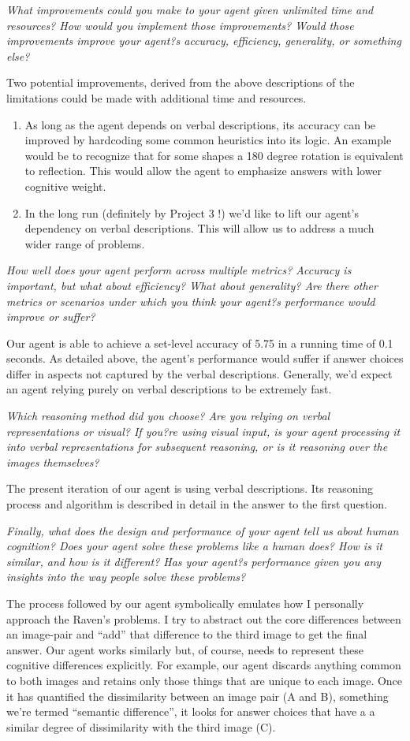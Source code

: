 \documentclass[10pt,letterpaper]{article}
\newcommand{\mypar}{\par{\vspace{0.2cm}}}
\newcommand{\rubric}[1]{\mypar{}\textcolor{mygray}{\emph{#1}}\mypar{}}
\begin{document}
\rubric{What improvements could you make to your agent given unlimited time and resources? How would you implement those improvements? Would those improvements improve your agent?s accuracy, efficiency, generality, or something else?}
Two potential improvements, derived from the above descriptions of the limitations could be made with additional time and resources.
\begin{enumerate}
\item As long as the agent depends on verbal descriptions, its accuracy can be improved by hardcoding some common heuristics into its logic. An example would be to recognize that for some shapes a 180 degree rotation is equivalent to reflection. This would allow the agent to emphasize answers with lower cognitive weight. 

\item In the long run (definitely by Project 3 !) we'd like to lift our agent's dependency on verbal descriptions. This will allow us to address a much wider range of problems.
\end{enumerate}
\rubric{How well does your agent perform across multiple metrics? Accuracy is important, but what about efficiency? What about generality? Are there other metrics or scenarios under which you think your agent?s performance would improve or suffer?}
Our agent is able to achieve a set-level accuracy of 5.75 in a running time of 0.1 seconds. As detailed above, the agent's performance would suffer if answer choices differ in aspects not captured by the verbal descriptions. Generally, we'd expect an agent relying purely on verbal descriptions to be extremely fast.
\rubric{Which reasoning method did you choose? Are you relying on verbal representations or visual? If you?re using visual input, is your agent processing it into verbal representations for subsequent reasoning, or is it reasoning over the images themselves?}
The present iteration of our agent is using verbal descriptions. Its reasoning process and algorithm is described in detail in the answer to the first question. 
\rubric{Finally, what does the design and performance of your agent tell us about human cognition? Does your agent solve these problems like a human does? How is it similar, and how is it different? Has your agent?s performance given you any insights into the way people solve these problems?}
The process followed by our agent symbolically emulates how I personally approach the Raven's problems. I try to abstract out the core differences between an image-pair and ``add'' that difference to the third image to get the final answer. Our agent works similarly but, of course, needs to represent these cognitive differences explicitly. For example, our agent discards anything common to both images and retains only those things that are unique to each image. Once it has quantified the dissimilarity between an image pair (A and B), something we're termed ``semantic difference'', it looks for answer choices that have a a similar degree of dissimilarity with the third image (C). 
\end{document}
